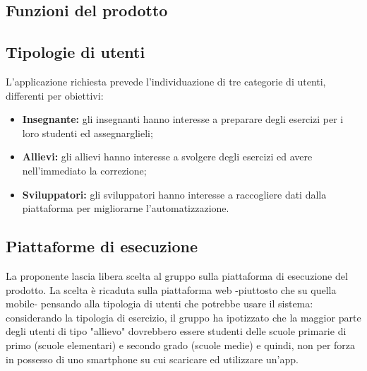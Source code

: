 \subsection{Funzioni del prodotto}


\subsection{Tipologie di utenti}
L'applicazione richiesta prevede l'individuazione di tre categorie di utenti, differenti per obiettivi:
\begin{itemize}
	\item \textbf{Insegnante:} gli insegnanti hanno interesse a preparare degli esercizi per i loro studenti ed assegnarglieli;
	\item \textbf{Allievi:} gli allievi hanno interesse a svolgere degli esercizi ed avere nell'immediato la correzione;
	\item \textbf{Sviluppatori:} gli sviluppatori hanno interesse a raccogliere dati dalla piattaforma per migliorarne l'automatizzazione.
\end{itemize}

\subsection{Piattaforme di esecuzione}
	La proponente lascia libera scelta al gruppo sulla piattaforma di esecuzione del prodotto. 
La scelta è ricaduta sulla piattaforma web -piuttosto che su quella mobile- pensando alla tipologia di utenti che potrebbe usare il sistema: considerando la tipologia di esercizio, il gruppo ha ipotizzato che la maggior parte degli utenti di tipo "allievo" dovrebbero essere studenti delle scuole primarie di primo (scuole elementari) e secondo grado (scuole medie) e quindi, non per forza in possesso di uno smartphone su cui scaricare ed utilizzare un'app.
